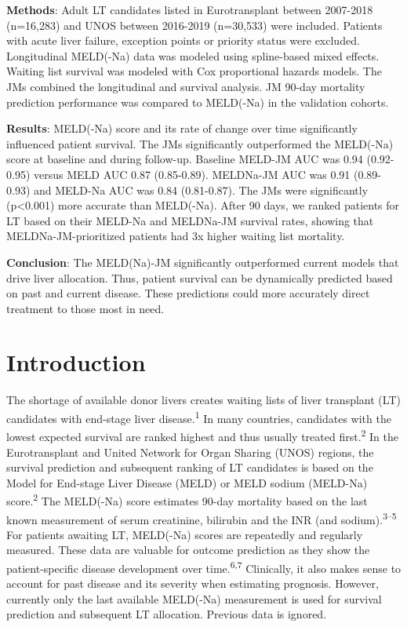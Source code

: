 \documentclass[11pt,english,]{book} %
\begin{document}
\textbf{Methods}: Adult LT candidates listed in Eurotransplant between 2007-2018 (n=16,283) and UNOS between 2016-2019 (n=30,533) were included. Patients with acute liver failure, exception points or priority status were excluded. Longitudinal MELD(-Na) data was modeled using spline-based mixed effects. Waiting list survival was modeled with Cox proportional hazards models. The JMs combined the longitudinal and survival analysis. JM 90-day mortality prediction performance was compared to MELD(-Na) in the validation cohorts.

\textbf{Results}: MELD(-Na) score and its rate of change over time significantly influenced patient survival. The JMs significantly outperformed the MELD(-Na) score at baseline and during follow-up. Baseline MELD-JM AUC was 0.94 (0.92-0.95) versus MELD AUC 0.87 (0.85-0.89). MELDNa-JM AUC was 0.91 (0.89-0.93) and MELD-Na AUC was 0.84 (0.81-0.87). The JMs were significantly (p\textless0.001) more accurate than MELD(-Na). After 90 days, we ranked patients for LT based on their MELD-Na and MELDNa-JM survival rates, showing that MELDNa-JM-prioritized patients had 3x higher waiting list mortality.

\textbf{Conclusion}: The MELD(Na)-JM significantly outperformed current models that drive liver allocation. Thus, patient survival can be dynamically predicted based on past and current disease. These predictions could more accurately direct treatment to those most in need.

\newpage
\normalsize
\linespread{1.213}

\hypertarget{introduction-2}{%
\section*{Introduction}\label{introduction-2}}

The shortage of available donor livers creates waiting lists of liver transplant (LT) candidates with end-stage liver disease.\textsuperscript{1} In many countries, candidates with the lowest expected survival are ranked highest and thus usually treated first.\textsuperscript{2} In the Eurotransplant and United Network for Organ Sharing (UNOS) regions, the survival prediction and subsequent ranking of LT candidates is based on the Model for End-stage Liver Disease (MELD) or MELD sodium (MELD-Na) score.\textsuperscript{2} The MELD(-Na) score estimates 90-day mortality based on the last known measurement of serum creatinine, bilirubin and the INR (and sodium).\textsuperscript{3--5} For patients awaiting LT, MELD(-Na) scores are repeatedly and regularly measured. These data are valuable for outcome prediction as they show the patient-specific disease development over time.\textsuperscript{6,7} Clinically, it also makes sense to account for past disease and its severity when estimating prognosis. However, currently only the last available MELD(-Na) measurement is used for survival prediction and subsequent LT allocation. Previous data is ignored.
\end{document}

